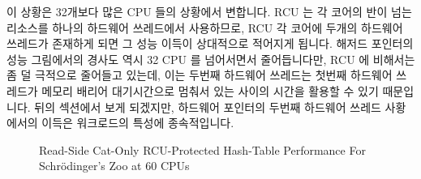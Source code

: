이 상황은 32개보다 많은 CPU 들의 상황에서 변합니다.
RCU 는 각 코어의 반이 넘는 리소스를 하나의 하드웨어 쓰레드에서 사용하므로, RCU
각 코어에 두개의 하드웨어 쓰레드가 존재하게 되면 그 성능 이득이 상대적으로
적어지게 됩니다.
해저드 포인터의 성능 그림에서의 경사도 역시 32 CPU 를 넘어서면서 줄어듭니다만,
RCU 에 비해서는 좀 덜 극적으로 줄어들고 있는데, 이는 두번째 하드웨어 쓰레드는
첫번째 하드웨어 쓰레드가 메모리 배리어 대기시간으로 멈춰서 있는 사이의 시간을
활용할 수 있기 때문입니다.
뒤의 섹션에서 보게 되겠지만, 하드웨어 포인터의 두번째 하드웨어 쓰레드
사황에서의 이득은 워크로드의 특성에 종속적입니다.

\begin{figure}[tb]
\centering
{}
\caption{Read-Side Cat-Only RCU-Protected Hash-Table Performance For Schr\"odinger's Zoo at 60 CPUs}
\label{fig:datastruct:Read-Side Cat-Only RCU-Protected Hash-Table Performance For Schroedinger's Zoo at 60 CPUs}
\end{figure}


